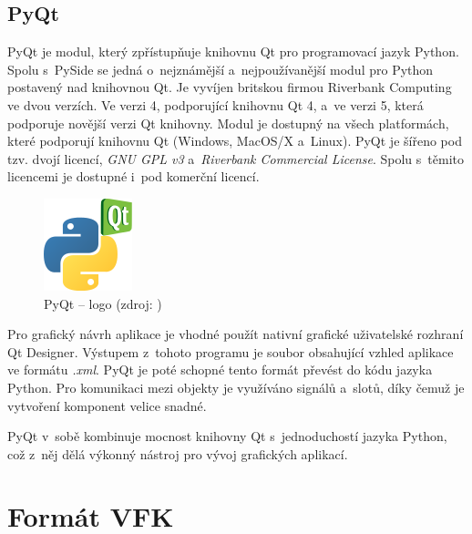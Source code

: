 \documentclass[a4paper,12pt,oneside]{book}
\begin{document}
\section{PyQt}

PyQt je modul, který zpřístupňuje knihovnu Qt pro programovací jazyk Python. Spolu s~PySide se jedná o~nejznámější a~nejpoužívanější modul pro Python postavený nad knihovnou Qt. Je vyvíjen britskou firmou Riverbank Computing ve dvou verzích. Ve verzi 4, podporující knihovnu Qt 4, a~ve verzi 5, která podporuje novější verzi Qt knihovny. Modul je dostupný na všech platformách, které podporují knihovnu Qt (Windows, MacOS/X a~Linux). PyQt je šířeno pod tzv. dvojí licencí, \textit{GNU GPL v3} a~\textit{Riverbank Commercial License}. Spolu s~těmito licencemi je dostupné i~pod komerční licencí.

\begin{figure}[htb]
\centering
\includegraphics[scale=1]{images/pyqt-logo.png}
\caption[PyQt -- logo]{PyQt -- logo (zdroj: \cite{pyqt_wiki})}
\end{figure}

Pro grafický návrh aplikace je vhodné použít nativní grafické uživatelské rozhraní Qt Designer. Výstupem z~tohoto programu je soubor obsahující vzhled aplikace ve formátu \textit{.xml}. PyQt je poté schopné tento formát převést do kódu jazyka Python. Pro komunikaci mezi objekty je využíváno signálů a~slotů, díky čemuž je vytvoření komponent velice snadné.

PyQt v~sobě kombinuje mocnost knihovny Qt s~jednoduchostí jazyka Python, což z~něj dělá výkonný nástroj pro vývoj grafických aplikací.
\cite{pyqt}
\cite{pyqt_wiki}



\clearpage
\chapter{Formát VFK}

\cite{dp_landa}
\cite{vfk_struktura}
\end{document}

